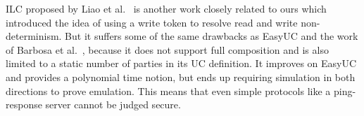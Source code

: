 %

ILC proposed by Liao et al.~\cite{ilc} is another work closely related to ours which introduced the idea of using a write token
to resolve read and write non-determinism.
But it suffers some of the same drawbacks as EasyUC and the work of Barbosa et al.~\cite{barbosa},
because it does not support full composition and is also limited to a static number of parties in its UC definition.
It improves on EasyUC and provides a polynomial time notion, but ends up requiring simulation in both directions to prove emulation. 
This means that even simple protocols like a ping-response server cannot be judged secure.

